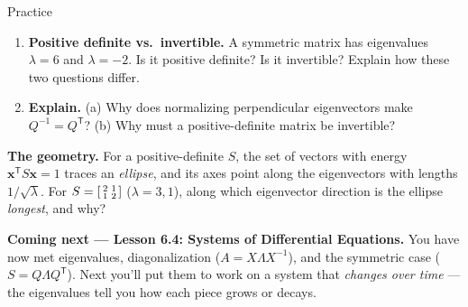 \documentclass[10pt]{article}
\newcommand{\xx}{\mathbf{x}}
\newcommand{\T}{\mathsf{T}}
\begin{document}
\begin{notesbox}{Practice}
\begin{enumerate}[leftmargin=1.9em, itemsep=12pt]
        at $\xx=\begin{bsmallmatrix}1\\0\end{bsmallmatrix}$ and at $\xx=\begin{bsmallmatrix}1\\1\end{bsmallmatrix}$.
        How do the results fit with $S$ being positive definite? 
  \item \textbf{Positive definite vs.\ invertible.} A symmetric matrix has eigenvalues $\lambda=6$ and
        $\lambda=-2$. Is it positive definite? Is it invertible? Explain how these two questions differ. 
  \item \textbf{Explain.} (a) Why does normalizing perpendicular eigenvectors make $Q^{-1}=Q^{\T}$?
        (b) Why must a positive-definite matrix be invertible? 
\end{enumerate}
\end{notesbox}

\begin{extensionbox}
\textbf{The geometry.} For a positive-definite $S$, the set of vectors with energy $\xx^{\T}S\xx=1$ traces an
\emph{ellipse}, and its axes point along the eigenvectors with lengths $1/\sqrt{\lambda}$. For
$S=\begin{bsmallmatrix}2&1\\1&2\end{bsmallmatrix}$ ($\lambda=3,1$), along which eigenvector direction is the
ellipse \emph{longest}, and why? 
\end{extensionbox}

\begin{spiralbox}
\textbf{Coming next --- Lesson 6.4: Systems of Differential Equations.} You have now met eigenvalues,
diagonalization ($A=X\Lambda X^{-1}$), and the symmetric case ($S=Q\Lambda Q^{\T}$). Next you'll put them to
work on a system that \emph{changes over time} --- the eigenvalues tell you how each piece grows or decays.
\end{spiralbox}
\end{document}
